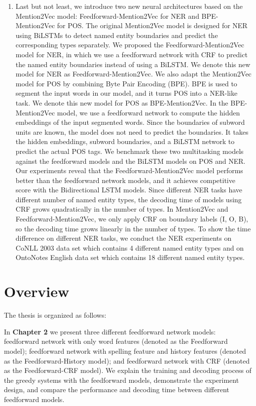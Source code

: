\documentclass{sfuthesis}
\newcommand{\ffa}{Feedforward-History}
\newcommand{\ffb}{Feedforward-CRF}
\newcommand{\ma}{Feedforward-Mention2Vec}
\newcommand{\mb}{BPE-Mention2Vec}
\begin{document}
\begin{enumerate}
\item Last but not least, we introduce two new neural architectures based on the Mention2Vec model: Feedforward-Mention2Vec for NER and BPE-Mention2Vec for POS. The original Mention2Vec model is designed for NER using BiLSTMs to detect named entity boundaries and predict the corresponding types separately. We proposed the Feedforward-Mention2Vec model for NER, in which we use a feedforward network with CRF to predict the named entity boundaries instead of using a BiLSTM.  We denote this new model for NER as \ma. We also adapt the Mention2Vec model for POS by combining Byte Pair Encoding (BPE). BPE is used to segment the input words in our model, and it turns POS into a NER-like task. We denote this new model for POS as \mb. In the BPE-Mention2Vec model, we use a feedforward network to compute the hidden embeddings of the input segmented words. Since the boundaries of subword units are known, the model does not need to predict the boundaries. It takes the hidden embeddings, subword boundaries, and a BiLSTM network to predict the actual POS tags. We benchmark these two multitasking models against the feedforward models and the BiLSTM models on POS and NER. Our experiments reveal that the Feedforward-Mention2Vec model performs better than the feedforward network models, and it achieves competitive score with the Bidirectional LSTM models. Since different NER tasks have different number of named entity types, the decoding time of models using CRF grows quadratically in the number of types. In Mention2Vec and Feedforward-Mention2Vec, we only apply CRF on boundary labels (I, O, B), so the decoding time grows linearly in the number of types. To show the time difference on different NER tasks, we conduct the NER experiments on CoNLL 2003 data set which contains 4 different named entity types and on OntoNotes English data set which contains 18 different named entity types.

\end{enumerate}


\section{Overview}
The thesis is organized as follows:

In \textbf{Chapter 2}  we present three different feedforward network models: feedforward network with only word features (denoted as the Feedforward model); feedforward network with spelling feature and history features (denoted as the \ffa{} model); and feedforward network with CRF (denoted as the \ffb{} model). We explain the training and decoding process of the greedy systems with the feedforward models, demonstrate the experiment design, and compare the performance and decoding time between different feedforward models.
\end{document}

